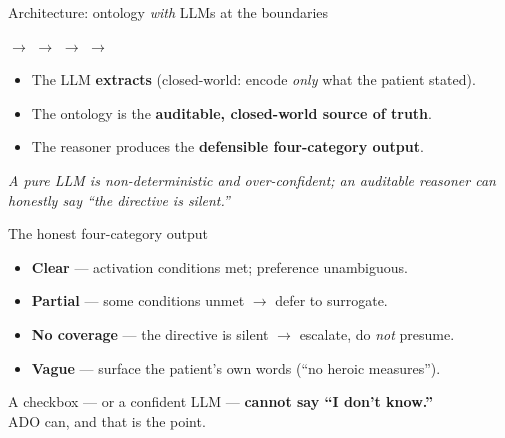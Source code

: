 \documentclass[aspectratio=169,10pt]{beamer}
\newcommand{\hl}[1]{\textcolor{adoblue}{\textbf{#1}}}
\begin{document}
\begin{frame}{Architecture: ontology \emph{with} LLMs at the boundaries}
  \begin{center}
  \footnotesize
   $\rightarrow$  $\rightarrow$  $\rightarrow$  $\rightarrow$ 
  \end{center}
  \vspace{0.6em}
  \begin{itemize}
    \item The LLM \hl{extracts} (closed-world: encode \emph{only} what the patient stated).
    \item The ontology is the \hl{auditable, closed-world source of truth}.
    \item The reasoner produces the \hl{defensible four-category output}.
  \end{itemize}
  \vspace{0.3em}
  \begin{center}
    \emph{A pure LLM is non-deterministic and over-confident; an auditable reasoner can honestly say ``the directive is silent.''}
  \end{center}
\end{frame}

\begin{frame}{The honest four-category output}
  \begin{itemize}
    \item \hl{Clear} --- activation conditions met; preference unambiguous.
    \item \hl{Partial} --- some conditions unmet $\rightarrow$ defer to surrogate.
    \item \hl{No coverage} --- the directive is silent $\rightarrow$ escalate, do \emph{not} presume.
    \item \hl{Vague} --- surface the patient's own words (``no heroic measures'').
  \end{itemize}
  \vspace{0.6em}
  \begin{center}
    A checkbox --- or a confident LLM --- \textbf{cannot say ``I don't know.''}\\ ADO can, and that is the point.
  \end{center}
\end{frame}
\end{document}
